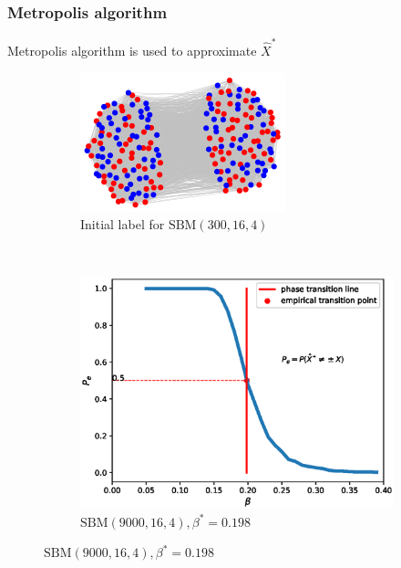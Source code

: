 \documentclass[notheorems]{beamer}
\begin{document}
	\begin{frame}
	\frametitle{Metropolis algorithm}
	Metropolis algorithm is used to approximate $\hat{X}^*$
	
	
	\begin{figure}
		\centering
		\begin{subfigure}{0.45\textwidth}
			\includegraphics[width=\textwidth]{000.png}
			\caption{Initial label for $\textrm{SBM}(300, 16, 4)$}
		\end{subfigure}~
		\begin{subfigure}{0.53\textwidth}
			\includegraphics[width=\textwidth]{beta_trans-2020-11-28.eps}
			\caption{$\textrm{SBM}(9000, 16, 4), \beta^*=0.198$}
		\end{subfigure}
	\end{figure}
	\end{frame}
	
\end{document}
